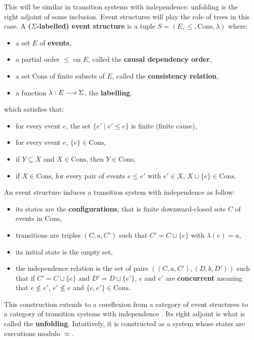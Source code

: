 	This will be similar in transition systems with independence: unfolding is the right adjoint of some inclusion. Event structures will play the role of trees in this case. A \textbf{($\Sigma$-labelled) event structure} is a tuple $S = (E,\leq,\text{Cons},\lambda)$ where:
	\begin{itemize}
		\item a set $E$ of \textbf{events},
		\item a partial order $\leq$ on $E$, called the \textbf{causal dependency order},
		\item a set $\text{Cons}$ of finite subsets of $E$, called the \textbf{consistency relation},
		\item a function $\lambda : E \longrightarrow \Sigma$, the \textbf{labelling}.
	\end{itemize}
\noindent which satisfies that:
	\begin{itemize}
		\item for every event $e$, the set $\{e' \mid e' \leq e\}$ is finite (finite cause),
		\item for every event $e$, $\{e\} \in \text{Cons}$,
		\item if $Y \subseteq X$ and $X \in \text{Cons}$, then $Y \in \text{Cons}$,
		\item if $X \in \text{Cons}$, for every pair of events $e \leq e'$ with $e' \in X$, $X\cup\{e\} \in \text{Cons}$.
	\end{itemize}
	
\noindent An event structure induces a transition system with independence  as follow:
	\begin{itemize}
		\item its states are the \textbf{configurations}, that is finite downward-closed sets $C$ of events in $\text{Cons}$,
		\item transitions are triples $(C,a,C')$ such that $C' = C \sqcup \{e\}$ with $\lambda(e) = a$,
		\item its initial state is the empty set,
		\item the independence relation is the set of pairs $((C,a,C'),(D,b,D'))$ such that if $C' = C \sqcup \{e\}$ and $D' = D \sqcup \{e'\}$, $e$ and $e'$ are \textbf{concurrent} meaning that $e \not\leq e'$, $e'\not\leq e$ and $\{e,e'\} \in \text{Cons}$.
	\end{itemize}
	This construction extends to a coreflexion from a category of event structures to a category of transition systems with independence \cite{nielsen94}. Its right adjoint is what is called the \textbf{unfolding}. Intuitively, it is constructed as a system whose states are executions modulo $\simeq$.
	
